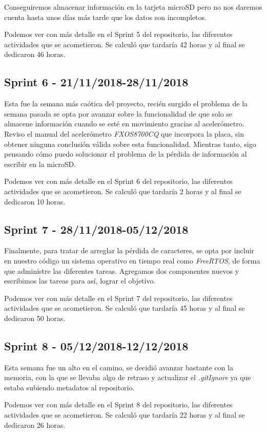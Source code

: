 Conseguiremos almacenar información en la tarjeta microSD pero no nos daremos cuenta hasta unos días más tarde que los datos son incompletos.

Podemos ver con más detalle en el Sprint 5 del repositorio, las diferentes actividades que se acometieron. 
Se calculó que tardaría 42 horas y al final se dedicaron 46 horas.

\subsection{Sprint 6 - 21/11/2018-28/11/2018 }
Esta fue la semana más caótica del proyecto, recién surgido el problema de la semana pasada se opta por avanzar sobre la funcionalidad de que solo se almacene información cuando se esté en movimiento gracias al acelerómetro. Reviso el manual del acelerómetro \textit{FXOS8700CQ} que incorpora la placa, sin obtener ninguna conclusión válida sobre esta funcionalidad.
Mientras tanto, sigo pensando cómo puedo solucionar el problema de la pérdida de información al escribir en la microSD.

Podemos ver con más detalle en el Sprint 6 del repositorio, las diferentes actividades que se acometieron. 
Se calculó que tardaría 2 horas y al final se dedicaron 10 horas.

\subsection{Sprint 7 - 28/11/2018-05/12/2018}
Finalmente, para tratar de arreglar la pérdida de caracteres, se opta por incluir en nuestro código un sistema operativo en tiempo real como \textit{FreeRTOS}, de forma que administre las diferentes tareas. Agregamos dos componentes nuevos y escribimos las tareas para así, lograr el objetivo.

Podemos ver con más detalle en el Sprint 7 del repositorio, las diferentes actividades que se acometieron. 
Se calculó que tardaría 45 horas y al final se dedicaron 50 horas.

\subsection{Sprint 8 - 05/12/2018-12/12/2018}
Esta semana fue un alto en el camino, se decidió avanzar bastante con la memoria, con la que se llevaba algo de retraso y actualizar el \textit{.gitIgnore} ya que estaba subiendo metadatos al repositorio.

Podemos ver con más detalle en el Sprint 8 del repositorio, las diferentes actividades que se acometieron. 
Se calculó que tardaría 22 horas y al final se dedicaron 26 horas.

